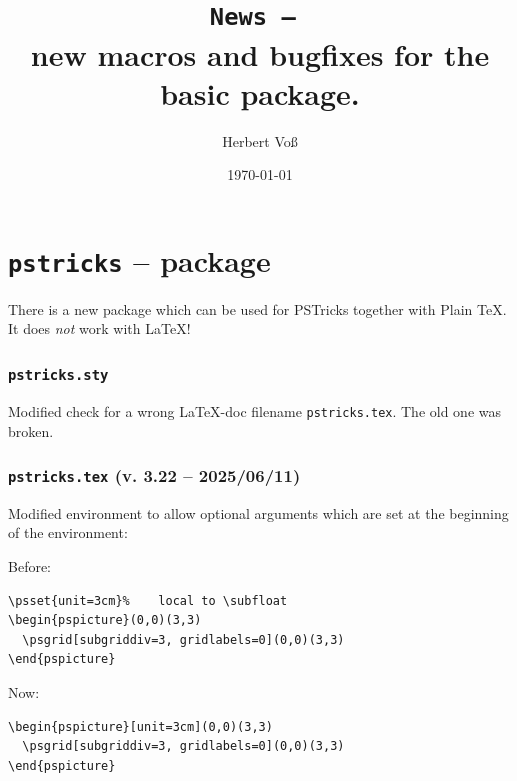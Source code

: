 \documentclass[11pt,english,BCOR=10mm,DIV=12,bibliography=totoc,parskip=false,headings=small,
    headinclude=false,footinclude=false,twoside,usegeometry,dvipsnames]{pst-doc}
\begin{document}
\title{\texttt{News -- \the\year}\\ \Large new macros and bugfixes for the basic package.}
\author{Herbert Voß}
\date{\today}

\settitle

\tableofcontents

\part{\texttt{pstricks} -- package}
There is a new package  which can be used for PSTricks together
with Plain \TeX. It does \emph{not} work with \LaTeX!

\section{\texttt{pstricks.sty}}
Modified check for a wrong \LaTeX-doc filename \texttt{pstricks.tex}. The old one was
broken.


\section{\texttt{pstricks.tex} (v. 3.22 -- 2025/06/11)}

Modified  environment to allow optional arguments which are set
at the beginning of the environment:

Before:

\begin{verbatim}
\psset{unit=3cm}%    local to \subfloat
\begin{pspicture}(0,0)(3,3)
  \psgrid[subgriddiv=3, gridlabels=0](0,0)(3,3)
\end{pspicture}
\end{verbatim}

Now:

\begin{verbatim}
\begin{pspicture}[unit=3cm](0,0)(3,3)
  \psgrid[subgriddiv=3, gridlabels=0](0,0)(3,3)
\end{pspicture}
\end{verbatim}
\end{document}
